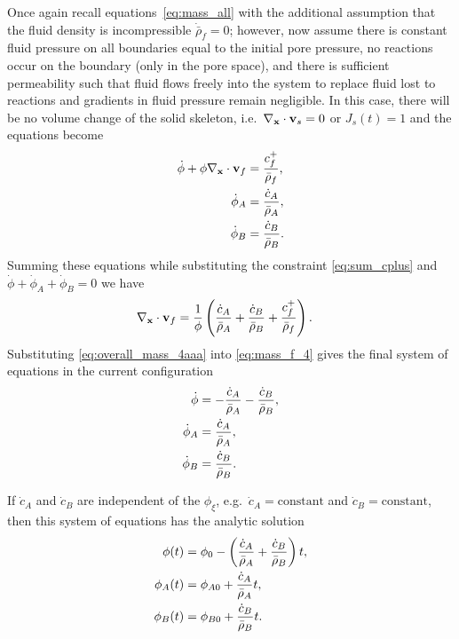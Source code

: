 \documentclass[11pt]{article}
\begin{document}
Once again recall equations~\eqref{eq:mass_all} with the additional assumption that the fluid density is incompressible $\dot{\bar{\rho}}_f = 0$; however, now assume there is constant fluid pressure on all boundaries equal to the initial pore pressure, no reactions occur on the boundary (only in the pore space), and there is sufficient permeability such that fluid flows freely into the system to replace fluid lost to reactions and gradients in fluid pressure remain negligible.  In this case, there will be no volume change of the solid skeleton, i.e.\ $\nabla_{\mathbf{x}} \cdot \mathbf{v}_s = 0$ or $J_s(t) = 1$ and the equations become
%
\begin{subequations}
\begin{align}
  \dot{\phi}  + \phi \nabla_{\mathbf{x}} \cdot \mathbf{v}_f &= \frac{c^{+}_f}{\bar\rho_f}, \label{eq:mass_f_4} \\
  \dot{\phi}_A  &= \frac{\dot{c}_A}{\bar\rho_A}, \notag \\
  \dot{\phi}_B  &= \frac{\dot{c}_B}{\bar\rho_B}. \notag
\end{align}
\end{subequations}
%
Summing these equations while substituting the constraint \eqref{eq:sum_cplus} and $\dot{\phi} + \dot{\phi}_A + \dot{\phi}_B = 0$ we have
%
\begin{align}
  \nabla_{\mathbf{x}} \cdot \mathbf{v}_f &= \frac{1}{\phi}\left(\frac{\dot{c}_A}{\bar{\rho}_A} + \frac{\dot{c}_B}{\bar{\rho}_B} + \frac{c^{+}_f}{\bar{\rho}_f}\right).
  \label{eq:overall_mass_4aaa}
\end{align}
%
Substituting \eqref{eq:overall_mass_4aaa} into \eqref{eq:mass_f_4} gives the final system of equations in the current configuration
%
\begin{subequations}
\begin{align}
  \dot{\phi}   &= -\frac{\dot{c}_A}{\bar\rho_A} - \frac{\dot{c}_B}{\bar\rho_B}, \notag \\
  \dot{\phi}_A  &= \frac{\dot{c}_A}{\bar\rho_A}, \notag \\
  \dot{\phi}_B  &= \frac{\dot{c}_B}{\bar\rho_B}. \notag
\end{align}
\end{subequations}
%

If $\dot{c}_{A}$ and $\dot{c}_{B}$ are independent of the $\phi_\xi$, e.g.\ $\dot{c}_{A} = \text{constant}$ and $\dot{c}_{B} = \text{constant}$, then this system of equations has the analytic solution
%
\begin{subequations}
\begin{align}
  \phi(t)   &= \phi_0 - \left(\frac{\dot{c}_A}{\bar\rho_A} + \frac{\dot{c}_B}{\bar\rho_B}\right) t, \notag \\
  \phi_A(t) &= \phi_{A0} + \frac{\dot{c}_A}{\bar\rho_A} t, \notag \\
  \phi_B(t) &= \phi_{B0} + \frac{\dot{c}_B}{\bar\rho_B} t. \notag
\end{align}
\end{subequations}
\end{document}
